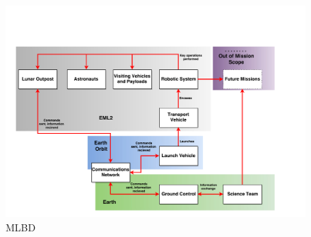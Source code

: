 \begin{figure}[H]
\centering
\includegraphics[width=\textwidth, height=\textheight, keepaspectratio]{Figures/MLBD}
\caption{\acrlong{MLBD}}
\label{fig:MLBD}
\end{figure}
